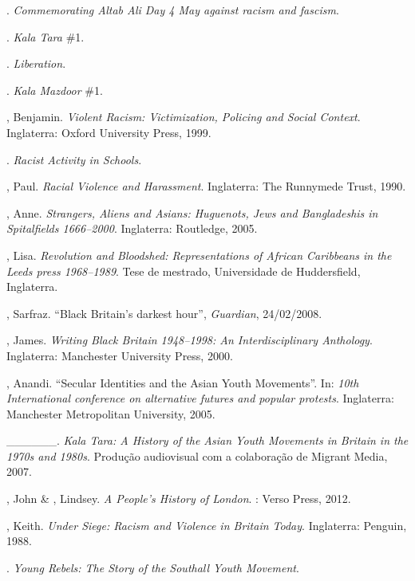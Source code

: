 \begin{Parskip}
. \emph{Commemorating Altab Ali Day 4 May against racism and fascism}.

. \emph{Kala Tara} \#1.

. \emph{Liberation}.

. \emph{Kala Mazdoor} \#1.

, Benjamin. \emph{Violent Racism: Victimization, Policing and Social Context}. Inglaterra: Oxford University Press, 1999.

. \emph{Racist Activity in Schools}.

, Paul. \emph{Racial Violence and Harassment}. Inglaterra: The Runnymede Trust, 1990.

, Anne. \emph{Strangers, Aliens and Asians: Huguenots, Jews and Bangladeshis in Spitalfields 1666--2000}. Inglaterra: Routledge, 2005.

, Lisa. \emph{Revolution and Bloodshed: Representations of African Caribbeans in the Leeds press 1968--1989}. Tese de mestrado, Universidade de Huddersfield, Inglaterra.

, Sarfraz. ``Black Britain's darkest hour'', \emph{Guardian}, 24/02/2008.

, James. \emph{Writing Black Britain 1948--1998: An Interdisciplinary Anthology}. Inglaterra: Manchester University Press, 2000.

, Anandi. ``Secular Identities and the Asian Youth Movements''. In: \emph{10th International conference on alternative futures and popular protests}. Inglaterra: Manchester Metropolitan University, 2005.

\_\_\_\_\_\_. \emph{Kala Tara: A History of the Asian Youth Movements in Britain in the 1970s and 1980s}. Produção audiovisual com a colaboração de Migrant Media, 2007.

, John \& , Lindsey. \emph{A People's History of London}. : Verso Press, 2012.

, Keith. \emph{Under Siege: Racism and Violence in Britain Today}. Inglaterra: Penguin, 1988.

. \emph{Young Rebels: The Story of the Southall Youth Movement}.


\end{Parskip}
